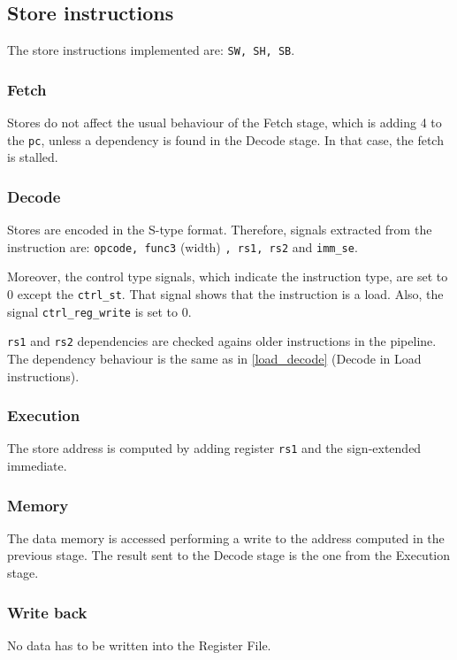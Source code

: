 \subsection{Store instructions}
The store instructions implemented are: \texttt{SW, SH, SB}.

\subsubsection{Fetch}
Stores do not affect the usual behaviour of the Fetch stage, which is adding 4 to the \texttt{pc}, unless a dependency is found in the Decode stage.
In that case, the fetch is stalled.

\subsubsection{Decode}
Stores are encoded in the S-type format.
Therefore, signals extracted from the instruction are: \texttt{opcode, func3} (width) \texttt{, rs1, rs2} and \texttt{imm\_se}.

Moreover, the control type signals, which indicate the instruction type, are set to 0 except the \texttt{ctrl\_st}. That signal shows that the instruction is a load.
Also, the signal \texttt{ctrl\_reg\_write} is set to 0.

\texttt{rs1} and \texttt{rs2} dependencies are checked agains older instructions in the pipeline. 
The dependency behaviour is the same as in \autoref{load_decode} (Decode in Load instructions).

\subsubsection{Execution}
The store address is computed by adding register \texttt{rs1} and the sign-extended immediate.

\subsubsection{Memory}
The data memory is accessed performing a write to the address computed in the previous stage.
The result sent to the Decode stage is the one from the Execution stage.

\subsubsection{Write back}
No data has to be written into the Register File.
